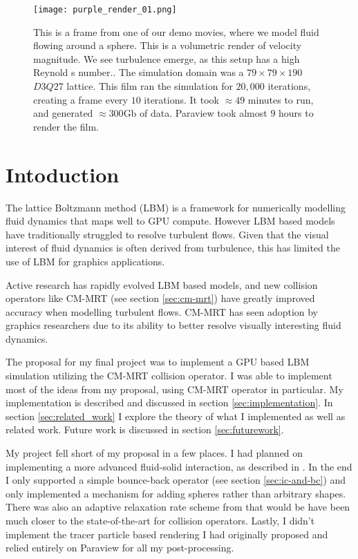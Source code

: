 \begin{figure*}
\begin{center}
  \texttt{[image: purple\_render\_01.png]}
\end{center}
\caption{This is a frame from one of our demo movies,
  where we model fluid flowing around a sphere.
  This is a volumetric render of velocity magnitude. 
  We see turbulence emerge, as this setup has a high Reynold
  s number..
  The simulation domain was a $79 \times 79 \times 190$ 
  $D3Q27$ lattice. 
  This film ran the simulation for $20,000$ iterations,
  creating a frame every $10$ iterations.
It took $\approx 49$ minutes to run, 
and generated $\approx 300$Gb of data.
Paraview took almost $9$ hours to render the film.}
\label{fig:movie-frame}
\end{figure*}

\section{Intoduction}

The lattice Boltzmann method (LBM) 
is a framework for numerically modelling fluid dynamics
that maps well to GPU compute.
However LBM based models have traditionally struggled to 
resolve turbulent flows.
Given that the visual interest of fluid dynamics is often 
derived from turbulence, this has limited the use of LBM 
for graphics applications.

Active research has rapidly evolved LBM based models,
and new collision operators like CM-MRT (see section \ref{sec:cm-mrt})
have greatly improved accuracy when modelling turbulent flows.
CM-MRT has seen adoption by graphics 
researchers \cite{Li2020, Li2024, Lyu2021} due
to its ability to better resolve visually interesting
fluid dynamics.

The proposal for my final project was to
implement a GPU based LBM simulation utilizing the CM-MRT collision 
operator.
I was able to implement most of the ideas from
my proposal, using CM-MRT operator in particular.
My implementation is described and discussed in section 
\ref{sec:implementation}.
In section \ref{sec:related_work} I explore the theory
of what I implemented as well as related work.
Future work is discussed in section \ref{sec:futurework}.


My project fell short of my proposal in a few places.
I had planned on implementing a more advanced fluid-solid
interaction, as described in \cite{Lyu2021}.
In the end I only supported a simple bounce-back operator 
(see section \ref{sec:ic-and-bc}) and only implemented a mechanism
for adding spheres rather than arbitrary shapes.
There was also an adaptive relaxation rate scheme from \cite{Li2020}
that would be have been much closer to the state-of-the-art for 
collision operators.
Lastly, I didn't implement the tracer particle based rendering
I had originally proposed and relied entirely on Paraview 
for all my post-processing.

